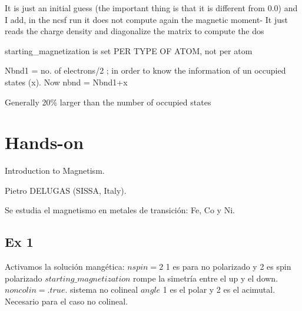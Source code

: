 
  It is just an initial guess (the important thing is that it is different from 0.0) and I add, in the ncsf run it does not compute again the magnetic moment- It just reads the charge  density and diagonalize the matrix to compute the dos


  starting\_magnetization is set PER TYPE OF ATOM, not per atom


  Nbnd1 = no. of electrons/2 ; in order to know the information of un occupied states (x). Now nbnd = Nbnd1+x

  Generally 20\% larger than the number of  occupied states

\section{Hands-on}

   Introduction to Magnetism.

  	Pietro DELUGAS (SISSA, Italy).

  Se estudia el magnetismo en metales de transición: Fe, Co y Ni.

\subsection{Ex 1}

  Activamos la solución mangética:
  $nspin = 2$ 1 es para no polarizado y 2 es spin polarizado
  $starting\_magnetization$ rompe la simetría entre el up y el down.
  $noncolin=.true.$ sistema no colineal
  $angle$ 1 es el polar y 2 es el acimutal. Necesario para el caso no colineal.
